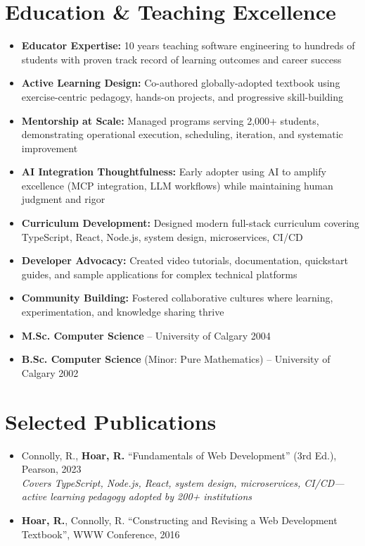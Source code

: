 \documentclass[11pt]{article}
\newcommand{\tech}[1]{\textcolor{secondary}{\textbf{#1}}}
\begin{document}
\section*{Education \& Teaching Excellence}
\begin{itemize}[nosep]
    \item \textbf{Educator Expertise:} 10 years teaching software engineering to hundreds of students with proven track record of learning outcomes and career success
    \item \textbf{Active Learning Design:} Co-authored globally-adopted textbook using exercise-centric pedagogy, hands-on projects, and progressive skill-building
    \item \textbf{Mentorship at Scale:} Managed programs serving 2,000+ students, demonstrating operational execution, scheduling, iteration, and systematic improvement
    \item \textbf{AI Integration Thoughtfulness:} Early adopter using AI to amplify excellence (MCP integration, LLM workflows) while maintaining human judgment and rigor
    \item \textbf{Curriculum Development:} Designed modern full-stack curriculum covering TypeScript, React, Node.js, system design, microservices, CI/CD
    \item \textbf{Developer Advocacy:} Created video tutorials, documentation, quickstart guides, and sample applications for complex technical platforms
    \item \textbf{Community Building:} Fostered collaborative cultures where learning, experimentation, and knowledge sharing thrive
    \item \tech{M.Sc. Computer Science} -- University of Calgary \hfill 2004
    \item \tech{B.Sc. Computer Science} (Minor: Pure Mathematics) -- University of Calgary \hfill 2002
\end{itemize}

\section*{Selected Publications}
\begin{itemize}[nosep,leftmargin=*]
    \item Connolly, R., \textbf{Hoar, R.} ``Fundamentals of Web Development'' (3rd Ed.), Pearson, 2023 \\
    \textit{Covers TypeScript, Node.js, React, system design, microservices, CI/CD—active learning pedagogy adopted by 200+ institutions}
    \item \textbf{Hoar, R.}, Connolly, R. ``Constructing and Revising a Web Development Textbook'', WWW Conference, 2016
\end{itemize}
\end{document}
